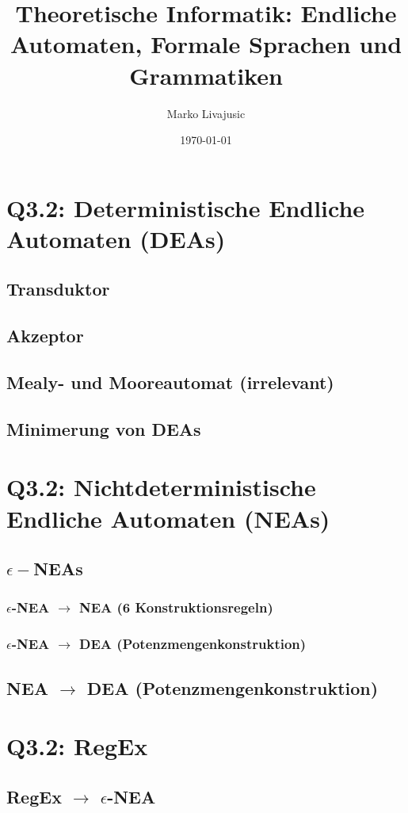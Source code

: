 \documentclass{article}
\author{Marko Livajusic}
\date{\today}
\title{Theoretische Informatik: Endliche Automaten, Formale Sprachen und Grammatiken}
\begin{document}
\maketitle
\tableofcontents

\section{Q3.2: Deterministische Endliche Automaten (DEAs)}
\subsection{Transduktor}
\subsection{Akzeptor}
\subsection{Mealy- und Mooreautomat (irrelevant)}
\subsection{Minimerung von DEAs}
\section{Q3.2: Nichtdeterministische Endliche Automaten (NEAs)}
\subsection{$\epsilon-$NEAs}
\subsubsection{$\epsilon$-NEA $\rightarrow$ NEA (6 Konstruktionsregeln)}
\subsubsection{$\epsilon$-NEA $\rightarrow$ DEA (Potenzmengenkonstruktion)}
\subsection{NEA $\rightarrow$ DEA (Potenzmengenkonstruktion)}
\section{Q3.2: RegEx}
\subsection{RegEx $\rightarrow$ $\epsilon$-NEA}
\end{document}
